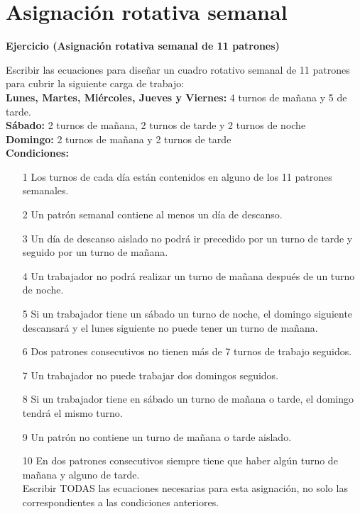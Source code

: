 \documentclass[a4paper,12pt]{article}
\newenvironment{exercise}[1]%
{%
  \par\vspace{\baselineskip}\noindent
  \textbf{Ejercicio (#1)}\begin{itshape}%
  \par\vspace{\baselineskip}\noindent\ignorespaces
}%
{%
  \end{itshape}\ignorespacesafterend
}
\begin{document}
\section{Asignaci\'on rotativa semanal}
\begin{exercise}{Asignaci\'on rotativa semanal de 11 patrones}

Escribir las ecuaciones para diseñar un cuadro rotativo semanal de 11 patrones para cubrir la siguiente carga de trabajo:\\

\textbf{Lunes, Martes, Mi\'ercoles, Jueves y Viernes:} 4 turnos de mañana y 5 de tarde.\\
\textbf{S\'abado:} 2 turnos de mañana, 2 turnos de tarde y 2 turnos de noche\\
\textbf{Domingo:} 2 turnos de mañana y 2 turnos de tarde\\

\textbf{Condiciones:}

\begin{itemize}
\item[1] Los turnos de cada d\'ia est\'an contenidos en alguno de los 11 patrones semanales. %
\item[2] Un patr\'on semanal contiene al menos un d\'ia de descanso. %
\item[3] Un d\'ia de descanso aislado no podr\'a ir precedido por un turno de tarde y seguido por un turno de mañana.%
\item[4] Un trabajador no podr\'a realizar un turno de mañana despu\'es de un turno de noche. %
\item[5] Si un trabajador tiene un s\'abado un turno de noche, el domingo siguiente descansar\'a y el lunes siguiente no puede tener un turno de mañana.
\item[6] Dos patrones consecutivos no tienen m\'as de 7 turnos de trabajo seguidos. %
\item[7] Un trabajador no puede trabajar dos domingos seguidos.%
\item[8] Si un trabajador tiene en s\'abado un turno de mañana o tarde, el domingo tendr\'a el mismo turno.%
\item[9] Un patr\'on no contiene un turno de mañana o tarde aislado.%
\item[10] En dos patrones consecutivos siempre tiene que haber alg\'un turno de mañana y alguno de tarde.\\%

Escribir TODAS las ecuaciones necesarias para esta asignaci\'on, no solo las correspondientes a las condiciones anteriores.
\end{itemize}

\end{exercise}
\end{document}
